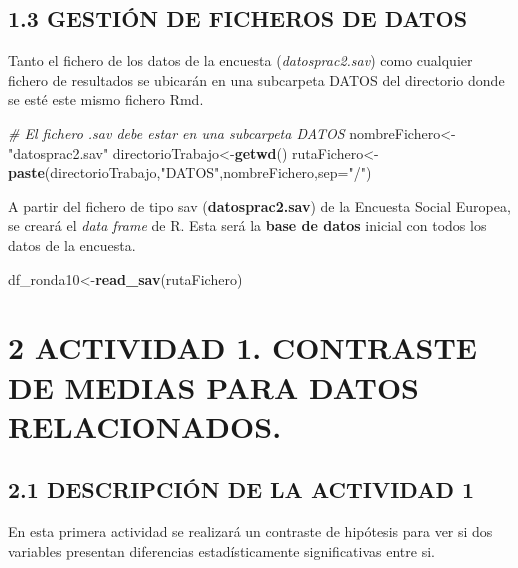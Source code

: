 \documentclass[
  12 pt,
  a4paper,
]{article}
\newenvironment{Shaded}{\begin{snugshade}}{\end{snugshade}}
\newcommand{\AttributeTok}[1]{\textcolor[rgb]{0.13,0.29,0.53}{#1}}
\newcommand{\CommentTok}[1]{\textcolor[rgb]{0.56,0.35,0.01}{\textit{#1}}}
\newcommand{\FunctionTok}[1]{\textcolor[rgb]{0.13,0.29,0.53}{\textbf{#1}}}
\newcommand{\NormalTok}[1]{#1}
\newcommand{\OtherTok}[1]{\textcolor[rgb]{0.56,0.35,0.01}{#1}}
\newcommand{\StringTok}[1]{\textcolor[rgb]{0.31,0.60,0.02}{#1}}
\begin{document}
\subsection{1.3 GESTIÓN DE FICHEROS DE
DATOS}\label{gestiuxf3n-de-ficheros-de-datos}

Tanto el fichero de los datos de la encuesta (\emph{datosprac2.sav})
como cualquier fichero de resultados se ubicarán en una subcarpeta DATOS
del directorio donde se esté este mismo fichero Rmd.

\begin{Shaded}
\begin{Highlighting}[]
\CommentTok{\# El fichero .sav debe estar en una subcarpeta DATOS}
\NormalTok{nombreFichero}\OtherTok{\textless{}{-}}\StringTok{"datosprac2.sav"}
\NormalTok{directorioTrabajo}\OtherTok{\textless{}{-}}\FunctionTok{getwd}\NormalTok{()}
\NormalTok{rutaFichero}\OtherTok{\textless{}{-}}\FunctionTok{paste}\NormalTok{(directorioTrabajo,}\StringTok{"DATOS"}\NormalTok{,nombreFichero,}\AttributeTok{sep=}\StringTok{"/"}\NormalTok{)}
\end{Highlighting}
\end{Shaded}

A partir del fichero de tipo sav (\textbf{datosprac2.sav}) de la
Encuesta Social Europea, se creará el \emph{data frame} de R. Esta será
la \textbf{base de datos} inicial con todos los datos de la encuesta.

\begin{Shaded}
\begin{Highlighting}[]
\NormalTok{df\_ronda10}\OtherTok{\textless{}{-}}\FunctionTok{read\_sav}\NormalTok{(rutaFichero)}
\end{Highlighting}
\end{Shaded}

\newpage

\section{2 ACTIVIDAD 1. CONTRASTE DE MEDIAS PARA DATOS
RELACIONADOS.}\label{actividad-1.-contraste-de-medias-para-datos-relacionados.}

\subsection{2.1 DESCRIPCIÓN DE LA ACTIVIDAD
1}\label{descripciuxf3n-de-la-actividad-1}

En esta primera actividad se realizará un contraste de hipótesis para
ver si dos variables presentan diferencias estadísticamente
significativas entre si.
\end{document}
